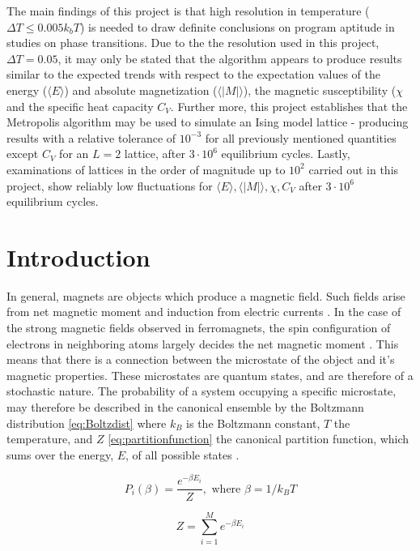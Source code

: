 \documentclass[%
oneside,                 %
final,                   %
10pt]{article}
\begin{document}
The main findings of this project is that high resolution in temperature ($\Delta T \leq 0.005 k_b T$) is needed to draw definite conclusions on program aptitude in studies on phase transitions. Due to the the resolution used in this project, $\Delta T = 0.05$, it may only be stated that the algorithm appears to produce results similar to the expected trends with respect to the expectation values of the energy ($\langle E \rangle$) and absolute magnetization ($\langle |M| \rangle$), the magnetic susceptibility ($\chi$and the specific heat capacity $ C_V$. Further more, this project establishes that the Metropolis algorithm may be used to simulate an Ising model lattice - producing results with a relative tolerance of $10^{-3}$ for all previously mentioned quantities except $C_V$
for an $L=2$ lattice, after $3\cdot 10^6$ equilibrium cycles. Lastly, examinations of lattices in the order of magnitude up to $10^2$ carried out in this project, show reliably low fluctuations for $\langle E \rangle, \langle |M| \rangle, \chi, C_V$ after  $3\cdot 10^6$ equilibrium cycles.


\section{Introduction}


In general, magnets are objects which produce a magnetic field. Such fields arise from net magnetic moment and induction from electric currents  \cite{FeynmanMM}. In the case of the strong magnetic fields observed in ferromagnets, the spin configuration of electrons in neighboring atoms largely decides the net magnetic moment \cite{FeynmanFM}. This means that there is a connection between the microstate of the object and it's magnetic properties. These microstates are quantum states, and are therefore of a stochastic nature. The probability of a system occupying a specific microstate, may therefore be described in the canonical ensemble by the Boltzmann distribution \eqref{eq:Boltzdist} where $k_B$ is the Boltzmann constant, $T$ the temperature,  and $Z$ \eqref{eq:partitionfunction} the canonical partition function, which sums over the energy, $E$, of all possible states \cite{HJ-SP}. 

\begin{equation}
P_i(\beta)=\frac{e^{-\beta E_i}}{Z}, \text{ where }\beta=1/k_BT 
\label{eq:Boltzdist}
\end{equation}

\begin{equation}
Z=\sum_{i=1}^M e^{-\beta E_i}
\label{eq:partitionfunction}
\end{equation}
\end{document}
